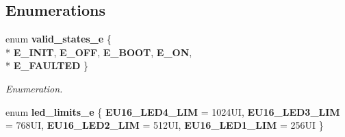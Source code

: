 \subsection*{Enumerations}
\begin{DoxyCompactItemize}
\item 
enum {\bf valid\-\_\-states\-\_\-e} \{ \\*
{\bf E\-\_\-\-I\-N\-I\-T}, 
{\bf E\-\_\-\-O\-F\-F}, 
{\bf E\-\_\-\-B\-O\-O\-T}, 
{\bf E\-\_\-\-O\-N}, 
\\*
{\bf E\-\_\-\-F\-A\-U\-L\-T\-E\-D}
 \}
\begin{DoxyCompactList}\small\item\em Enumeration. \end{DoxyCompactList}\item 
enum {\bf led\-\_\-limits\-\_\-e} \{ {\bf E\-U16\-\_\-\-L\-E\-D4\-\_\-\-L\-I\-M} =  1024\-U\-I, 
{\bf E\-U16\-\_\-\-L\-E\-D3\-\_\-\-L\-I\-M} =  768\-U\-I, 
{\bf E\-U16\-\_\-\-L\-E\-D2\-\_\-\-L\-I\-M} =  512\-U\-I, 
{\bf E\-U16\-\_\-\-L\-E\-D1\-\_\-\-L\-I\-M} =  256\-U\-I
 \}
\end{DoxyCompactItemize}
